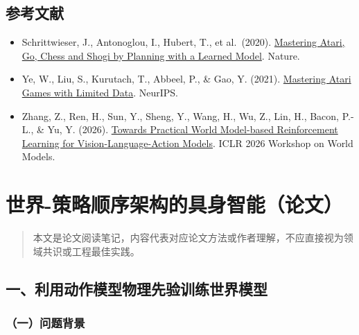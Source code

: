\hypertarget{ux53c2ux8003ux6587ux732e-204}{%
\subsection{参考文献}\label{ux53c2ux8003ux6587ux732e-204}}

\begin{itemize}
\tightlist
\item
  Schrittwieser, J., Antonoglou, I., Hubert, T., et al.~(2020). \href{https://www.nature.com/articles/s41586-020-03051-4}{Mastering Atari, Go, Chess and Shogi by Planning with a Learned Model}. Nature.
\item
  Ye, W., Liu, S., Kurutach, T., Abbeel, P., \& Gao, Y. (2021). \href{https://arxiv.org/abs/2111.00210}{Mastering Atari Games with Limited Data}. NeurIPS.
\item
  Zhang, Z., Ren, H., Sun, Y., Sheng, Y., Wang, H., Wu, Z., Lin, H., Bacon, P.-L., \& Yu, Y. (2026). \href{https://openreview.net/forum?id=gB1yFEd106}{Towards Practical World Model-based Reinforcement Learning for Vision-Language-Action Models}. ICLR 2026 Workshop on World Models.
\end{itemize}

\clearpage

\hypertarget{ux4e16ux754c-ux7b56ux7565ux987aux5e8fux67b6ux6784ux7684ux5177ux8eabux667aux80fdux8bbaux6587}{%
\section{世界-策略顺序架构的具身智能（论文）}\label{ux4e16ux754c-ux7b56ux7565ux987aux5e8fux67b6ux6784ux7684ux5177ux8eabux667aux80fdux8bbaux6587}}

\begin{quote}
本文是论文阅读笔记，内容代表对应论文方法或作者理解，不应直接视为领域共识或工程最佳实践。
\end{quote}

\hypertarget{ux4e00ux5229ux7528ux52a8ux4f5cux6a21ux578bux7269ux7406ux5148ux9a8cux8badux7ec3ux4e16ux754cux6a21ux578b}{%
\subsection{一、利用动作模型物理先验训练世界模型}\label{ux4e00ux5229ux7528ux52a8ux4f5cux6a21ux578bux7269ux7406ux5148ux9a8cux8badux7ec3ux4e16ux754cux6a21ux578b}}

\hypertarget{ux4e00ux95eeux9898ux80ccux666f-21}{%
\subsubsection{（一）问题背景}\label{ux4e00ux95eeux9898ux80ccux666f-21}}

